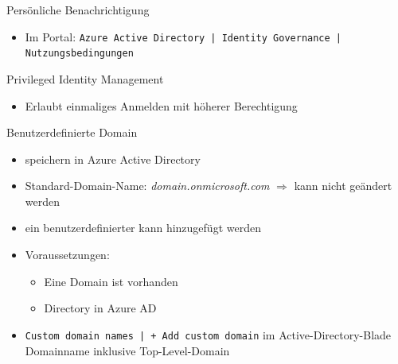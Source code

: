 \begin{flashcard}[Definition]{Persönliche Benachrichtigung}
    \begin{itemize}
        \item Im Portal:\newline
            \texttt{Azure Active Directory | Identity Governance | Nutzungsbedingungen }
    \end{itemize}
\end{flashcard}

\begin{flashcard}[Definition]{Privileged Identity Management}
    \begin{itemize}
        \item Erlaubt einmaliges Anmelden mit höherer Berechtigung
    \end{itemize}
\end{flashcard}


\begin{flashcard}[Definition]{Benutzerdefinierte Domain}
    \begin{itemize}
        \item speichern in Azure Active Directory
        \item Standard-Domain-Name: \emph{domain.onmicrosoft.com}\newline
            $\Rightarrow$ kann nicht geändert werden
        \item ein benutzerdefinierter kann hinzugefügt werden
        \item Voraussetzungen:
            \begin{itemize}
                \item Eine Domain ist vorhanden
                \item Directory in Azure AD
            \end{itemize}
        \item \texttt{Custom domain names | + Add custom domain} im Active-Directory-Blade\newline
            Domainname inklusive Top-Level-Domain
    \end{itemize}
\end{flashcard}

